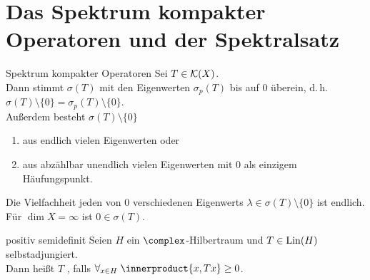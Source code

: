 \pagebreak

\section{%
    Das Spektrum kompakter Operatoren und der Spektralsatz%
}

\begin{Satz}{Spektrum kompakter Operatoren}
    Sei $T \in \mathcal{K}(X)$.\\
    Dann stimmt $\sigma(T)$ mit den Eigenwerten $\sigma_p(T)$ bis auf $0$ überein,
    d.\,h. $\sigma(T) \setminus \{0\} = \sigma_p(T) \setminus \{0\}$.\\
    Außerdem besteht $\sigma(T) \setminus \{0\}$
    \begin{enumerate}
        \item
        aus endlich vielen Eigenwerten oder

        \item
        aus abzählbar unendlich vielen Eigenwerten mit $0$ als einzigem Häufungspunkt.
    \end{enumerate}
    Die Vielfachheit jeden von $0$ verschiedenen Eigenwerts
    $\lambda \in \sigma(T) \setminus \{0\}$ ist endlich.\\
    Für $\dim X = \infty$ ist $0 \in \sigma(T)$.
\end{Satz}

\linie

\begin{Def}{positiv semidefinit}
    Seien $H$ ein $\complex$-Hilbertraum und $T \in \operatorname{Lin}(H)$ selbstadjungiert.\\
    Dann heißt $T$ , falls
    $\forall_{x \in H}\; \innerproduct{x, Tx} \ge 0$.
\end{Def}

